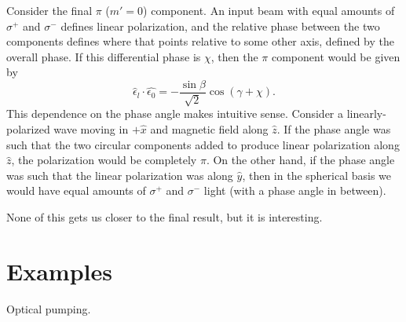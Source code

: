 \documentclass[final,5p,times,twocolumn]{elsarticle}
\begin{document}
Consider the final $\pi$ ($m'=0$) component.  An input beam with equal amounts
of $\sigma^+$ and $\sigma^-$  defines linear polarization, and the relative
phase between the two components defines where that points relative to some
other axis, defined by the overall  phase.  If this differential phase is
$\chi$, then the $\pi$ component would be given by
\begin{equation}
  \hat{\epsilon}_l\cdot\hat{\epsilon_0} = -\frac{\sin\beta}{\sqrt{2}}
  \cos(\gamma+\chi).
\end{equation}
This dependence on the phase angle makes intuitive sense.  Consider a
linearly-polarized wave moving in $+\hat{x}$ and magnetic field along $\hat{z}$.
If the phase angle was such that the two circular components added to produce
linear polarization along $\hat{z}$, the polarization would be completely $\pi$.
On the other hand, if the phase angle was such that the linear polarization was
along $\hat{y}$, then in the spherical basis we would have equal amounts of
$\sigma^+$ and $\sigma^-$ light (with a phase angle in between).

None of this gets us closer to the final result, but it is interesting.

\section{Examples}
Optical pumping.














\end{document}
